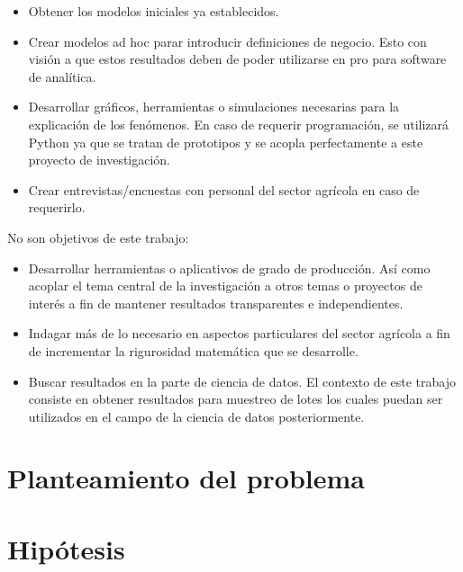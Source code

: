 \documentclass{report}
\begin{document}
\begin{itemize}
    \item Obtener los modelos iniciales ya establecidos.
    
    \item Crear modelos ad hoc parar introducir definiciones de negocio. Esto con visión a que estos resultados deben de poder utilizarse en pro para software de analítica.
    
    \item Desarrollar gráficos, herramientas o simulaciones necesarias para la explicación de los fenómenos. En caso de requerir programación, se utilizará Python ya que se tratan de prototipos y se acopla perfectamente a este proyecto de investigación.
    
    \item Crear entrevistas/encuestas con personal del sector agrícola en caso de requerirlo.
\end{itemize}

\bigbreak

No son objetivos de este trabajo:

\begin{itemize}
    \item Desarrollar herramientas o aplicativos de grado de producción. Así como acoplar el tema central de la investigación a otros temas o proyectos de interés a fin de mantener resultados transparentes e independientes.
    
    \item Indagar más de lo necesario en aspectos particulares del sector agrícola a fin de incrementar la rigurosidad matemática que se desarrolle.
    
    \item Buscar resultados en la parte de ciencia de datos. El contexto de este trabajo consiste en obtener resultados para muestreo de lotes los cuales puedan ser utilizados en el campo de la ciencia de datos posteriormente.
\end{itemize}

\section{Planteamiento del problema}


\section{Hipótesis}
\end{document}
